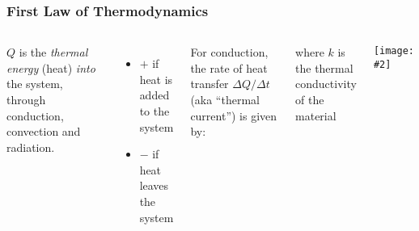 \documentclass[12pt,aspectratio=169]{beamer}
\newcommand{\pic}[2]{\texttt{[image: \#2]}}
\newcommand{\eq}[2]{\vspace{#1}{\Large\begin{displaymath}#2\end{displaymath}}}
\begin{document}
\begin{frame}
  \frametitle{First Law of Thermodynamics}

  \begin{columns}
    $Q$ is the \emph{thermal energy} (heat) \emph{into} the system, through
    conduction, convection and radiation.
    \begin{itemize}
    \item $+$ if heat is added to the system
    \item $-$ if heat leaves the system
    \end{itemize}

    For conduction, the rate of heat transfer $\Delta Q/\Delta t$ (aka ``thermal
    current'') is given by:

    \eq{-.2in}{
      \boxed{H=\frac{\Delta Q}{\Delta t}=kA\frac{\Delta T}{\Delta x}}
    }

    \vspace{-.15in}where $k$ is the thermal conductivity of the material

    \pic{1}{conduct.png}
    \end{columns}
\end{frame}
\end{document}
